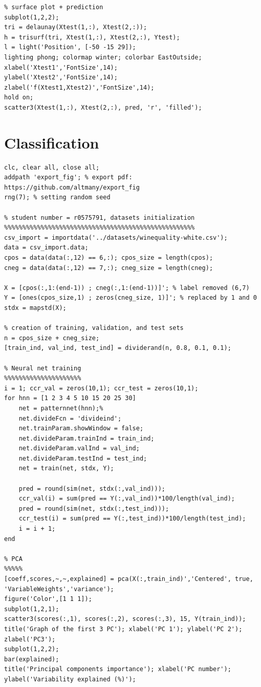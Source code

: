 \documentclass[11pt, a4paper]{article}
\begin{document}
\begin{appendices}
\begin{lstlisting}
% surface plot + prediction
subplot(1,2,2);
tri = delaunay(Xtest(1,:), Xtest(2,:));
h = trisurf(tri, Xtest(1,:), Xtest(2,:), Ytest);
l = light('Position', [-50 -15 29]);
lighting phong; colormap winter; colorbar EastOutside;
xlabel('Xtest1','FontSize',14); 
ylabel('Xtest2','FontSize',14);
zlabel('f(Xtest1,Xtest2)','FontSize',14);
hold on;
scatter3(Xtest(1,:), Xtest(2,:), pred, 'r', 'filled');
\end{lstlisting}

\section{Classification}
\begin{lstlisting}
clc, clear all, close all;
addpath 'export_fig'; % export pdf: https://github.com/altmany/export_fig
rng(7); % setting random seed

% student number = r0575791, datasets initialization
%%%%%%%%%%%%%%%%%%%%%%%%%%%%%%%%%%%%%%%%%%%%%%%%%%%%
csv_import = importdata('../datasets/winequality-white.csv');
data = csv_import.data;
cpos = data(data(:,12) == 6,:); cpos_size = length(cpos);
cneg = data(data(:,12) == 7,:); cneg_size = length(cneg);

X = [cpos(:,1:(end-1)) ; cneg(:,1:(end-1))]'; % label removed (6,7)
Y = [ones(cpos_size,1) ; zeros(cneg_size, 1)]'; % replaced by 1 and 0
stdx = mapstd(X);

% creation of training, validation, and test sets
n = cpos_size + cneg_size; 
[train_ind, val_ind, test_ind] = dividerand(n, 0.8, 0.1, 0.1);

% Neural net training
%%%%%%%%%%%%%%%%%%%%%
i = 1; ccr_val = zeros(10,1); ccr_test = zeros(10,1);
for hnn = [1 2 3 4 5 10 15 20 25 30]
    net = patternnet(hnn);%
    net.divideFcn = 'divideind';
    net.trainParam.showWindow = false;
    net.divideParam.trainInd = train_ind;
    net.divideParam.valInd = val_ind;
    net.divideParam.testInd = test_ind;
    net = train(net, stdx, Y);

    pred = round(sim(net, stdx(:,val_ind)));
    ccr_val(i) = sum(pred == Y(:,val_ind))*100/length(val_ind);
    pred = round(sim(net, stdx(:,test_ind)));
    ccr_test(i) = sum(pred == Y(:,test_ind))*100/length(test_ind);
    i = i + 1;
end

% PCA
%%%%%
[coeff,scores,~,~,explained] = pca(X(:,train_ind)','Centered', true, 'VariableWeights','variance');
figure('Color',[1 1 1]);
subplot(1,2,1);
scatter3(scores(:,1), scores(:,2), scores(:,3), 15, Y(train_ind));
title('Graph of the first 3 PC'); xlabel('PC 1'); ylabel('PC 2'); zlabel('PC3');
subplot(1,2,2);
bar(explained);
title('Principal components importance'); xlabel('PC number'); ylabel('Variability explained (%)');


\end{lstlisting}
\end{appendices}
\end{document}
